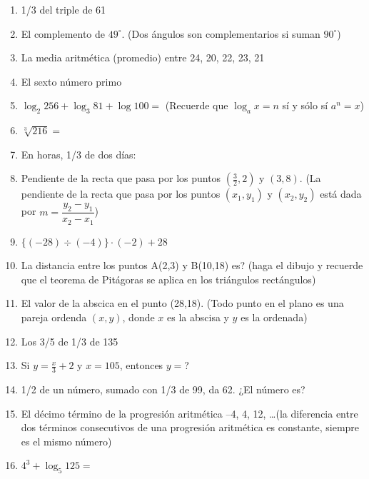 \documentclass[11pt,twoside,letter]{article}
\begin{document}
\begin{enumerate}
 \item 1/3 del triple de 61
 \item El complemento de $49^{\circ}$. (Dos ángulos son complementarios si suman $90^{\circ}$)
 \item La media aritmética (promedio) entre 24, 20, 22, 23, 21
 \item El sexto número primo
 \item $\log_{2}256+\log_{3}81+\log100=$ (Recuerde que $\log_{a}x=n$ s\'{i} y s\'{o}lo s\'{i} $a^{n}=x$)
 \item $\sqrt[3]{216}=$
 \item En horas, 1/3 de dos días:
 \item Pendiente de la recta que pasa por los puntos $\left(\frac{3}{2},2\right)$ y $(3,8)$. (La pendiente de la recta que pasa por los puntos $(x_{1},y_{1})$ y $(x_{2},y_{2})$ está dada por $m=\dfrac{y_{2}-y_{1}}{x_{2}-x_{1}}$)
 \item $\{(-28)\div(-4)\}\cdot(-2)+28$
 \item La distancia entre los puntos A(2,3) y B(10,18) es? (haga el dibujo y recuerde que el teorema de Pitágoras se aplica en los triángulos rectángulos)
 \item El valor de la abscica en el punto (28,18). (Todo punto en el plano es una pareja ordenda $(x,y)$, donde $x$ es la abscisa y $y$ es la ordenada)
 \item Los 3/5 de 1/3 de 135
 \item Si $y=\frac{x}{3}+2$ \; y \; $x=105$, entonces $y=$?
 \item 1/2 de un número, sumado con 1/3 de 99, da 62. ¿El número es?
 \item El décimo término de la progresión aritmética --4, 4, 12, \ldots (la diferencia entre dos términos consecutivos de una progresión aritmética es constante, siempre es el mismo número)
 \item $4^{3}+\log_{5}125=$
\end{enumerate}
\end{document}
